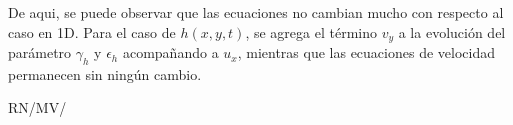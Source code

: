 ﻿\documentclass[spanish]{article}
\begin{document}
    De aqui, se puede observar que las ecuaciones no cambian mucho con respecto al caso en 1D. Para el caso de $h(x,y,t)$, se agrega el término $v_y$ a la evolución del parámetro $\gamma_h$ y $\epsilon_h$ acompañando a $u_x$, mientras que las ecuaciones de velocidad permanecen sin ningún cambio.

\newpage

 

\vfill\hfill RN/MV/\LaTeXe
\end{document}
